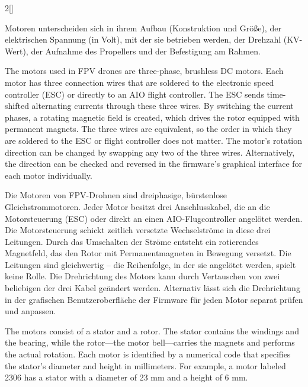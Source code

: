 \begin{paracol}{2}[]
\colger

Motoren unterscheiden sich in ihrem Aufbau (Konstruktion und Größe), der elektrischen Spannung (in Volt), mit der sie betrieben werden, der Drehzahl (KV-Wert), der Aufnahme des Propellers und der Befestigung am Rahmen.

\colende

\renewcommand{\deutschertitel}{Motoraufbau und -größe}
\renewcommand{\englischertitel}{Size of the Motors}
\makrounterabschnitt
\label{AbschnittMotorenSize}

The motors used in FPV drones are three-phase, brushless DC motors. Each motor has three connection wires that are soldered to the electronic speed controller (ESC) or directly to an AIO flight controller. The ESC sends time-shifted alternating currents through these three wires. By switching the current phases, a rotating magnetic field is created, which drives the rotor equipped with permanent magnets. The three wires are equivalent, so the order in which they are soldered to the ESC or flight controller does not matter.  The motor’s rotation direction can be changed by swapping any two of the three wires. Alternatively, the direction can be checked and reversed in the firmware’s graphical interface for each motor individually.

\colger

Die Motoren von FPV-Drohnen sind dreiphasige, bürstenlose Gleichstrommotoren. Jeder Motor besitzt drei Anschlusskabel, die an die Motorsteuerung (ESC) oder direkt an einen AIO-Flugcontroller angelötet werden. Die Motorsteuerung schickt zeitlich versetzte Wechselströme in diese drei Leitungen. Durch das Umschalten der Ströme entsteht ein rotierendes Magnetfeld, das den Rotor mit Permanentmagneten in Bewegung versetzt. Die Leitungen sind gleichwertig -- die Reihenfolge, in der sie angelötet werden, spielt keine Rolle. Die Drehrichtung des Motors kann durch Vertauschen von zwei beliebigen der drei Kabel geändert werden. Alternativ lässt sich die Drehrichtung in der grafischen Benutzeroberfläche der Firmware für jeden Motor separat prüfen und anpassen.

\coleng

The motors consist of a stator and a rotor. The stator contains the windings and the bearing, while the rotor—the motor bell—carries the magnets and performs the actual rotation.  Each motor is identified by a numerical code that specifies the stator’s diameter and height in millimeters. For example, a motor labeled 2306 has a stator with a diameter of 23 mm and a height of 6 mm.


\end{paracol}
